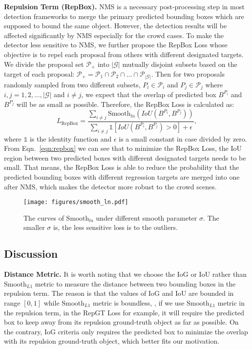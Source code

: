 \documentclass[10pt,twocolumn,letterpaper]{article}
\newcommand{\myparagraph}[1]{{\vspace{0.5em} \noindent \bf #1}}
\begin{document}
\myparagraph{Repulsion Term (RepBox).} NMS is a necessary post-processing step in most detection frameworks to merge the primary predicted bounding boxes which are supposed to bound the same object. However, the detection results will be affected significantly by NMS especially for the crowd cases. To make the detector less sensitive to NMS, we further propose the RepBox Loss whose objective is to repel each proposal from others with different designated targets. We divide the proposal set $\mathcal{P_+}$ into $|\mathcal{G}|$ mutually disjoint subsets based on the target of each proposal: $\mathcal{P_+} = \mathcal{P}_1 \cap \mathcal{P}_2 \cap \ldots \cap \mathcal{P}_{|\mathcal{G}|}$. Then for two proposals randomly sampled from two different subsets, $P_i \in \mathcal{P}_i$ and $P_j \in \mathcal{P}_j$ where $i,j=1,2,\ldots,{|\mathcal{G}|}$ and $i \neq j$, we expect that the overlap of predicted box $B^{P_i}$ and $B^{P_j}$ will be as small as possible. Therefore, the RepBox Loss is calculated as:
\begin{equation}
L_\mathrm{RepBox} = \frac{\sum_{i \neq j}{\mathrm{Smooth}_{ln}\left(IoU(B^{P_i}, B^{P_j})\right)}}{\sum_{i \neq j}{\mathds{1}{\left[IoU(B^{P_i}, B^{P_j}) > 0\right]}} + \epsilon},
\label{eqn:repbox}
\end{equation}
where $\mathds{1}$ is the identity function and $\epsilon$ is a small constant in case divided by zero. From Eqn.~\ref{eqn:repbox} we can see that to minimize the RepBox Loss, the IoU region between two predicted boxes with different designated targets needs to be small. That means, the RepBox Loss is able to reduce the probability that the predicted bounding boxes with different regression targets are merged into one after NMS, which makes the detector more robust to the crowd scenes.

\begin{figure}[t]
\centering
\texttt{[image: figures/smooth\_ln.pdf]}
\caption{The curves of $\mathrm{Smooth}_{ln}$ under different smooth parameter $\sigma$. The smaller $\sigma$ is, the less sensitive loss is to the outliers.}
\vspace{-0.2cm}
\label{fig:smoothparam}
\end{figure}

\subsection{Discussion}
\myparagraph{Distance Metric.} It is worth noting that we choose the IoG or IoU rather than $\mathrm{Smooth}_{L1}$ metric to measure the distance between two bounding boxes in the repulsion term. The reason is that the values of IoG and IoU are bounded in range $[0,1]$ while $\mathrm{Smooth}_{L1}$ metric is boundless, \ie, if we use $\mathrm{Smooth}_{L1}$ metric in the repulsion term, in the RepGT Loss for example, it will require the predicted box to keep away from its repulsion ground-truth object as far as possible. On the contrary, IoG criteria only requires the predicted box to minimize the overlap with its repulsion ground-truth object, which better fits our motivation.
\end{document}
